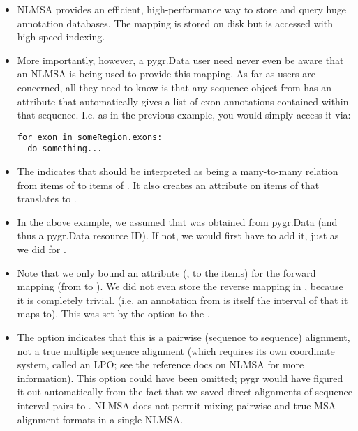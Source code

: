 \documentclass{howto}
\begin{document}
\begin{itemize}
\item NLMSA provides an efficient, high-performance way to store and
query huge annotation databases.  The mapping is stored on disk but is
accessed with high-speed indexing.

\item More importantly, however, a pygr.Data user need never even be
aware that an NLMSA is being used to provide this mapping.  As far as
users are concerned, all they need to know is that any sequence object from 
has an  attribute that automatically gives a list of exon
annotations contained within that sequence.  I.e. as in the previous 
example, you would simply access it via:
\begin{verbatim}
for exon in someRegion.exons:
  do something...
\end{verbatim}

\item The  indicates that  should
be interpreted as being a many-to-many relation from items of 
to items of .  It also creates an  attribute on
items of  that translates to .

\item In the above example, we assumed that  was obtained
from pygr.Data (and thus a pygr.Data resource ID).  If not, we would first
have to add it, just as we did for .

\item Note that we only bound an attribute (, to the 
 items) for the forward mapping (from  to ).
We did not even store the reverse mapping in , because
it is completely trivial.  (i.e. an annotation from  is itself
the interval of  that it maps to).  This was set by
the  option to the .

\item The  option indicates that this is a pairwise
(sequence to sequence) alignment, not a true multiple sequence alignment
(which requires its own coordinate system, called an LPO; see the reference
docs on NLMSA for more information).  This option could have been omitted;
pygr would have figured it out automatically from the fact that we saved 
direct alignments of sequence interval pairs to .  NLMSA does not
permit mixing pairwise and true MSA alignment formats in a single NLMSA.
\end{itemize}
\end{document}
